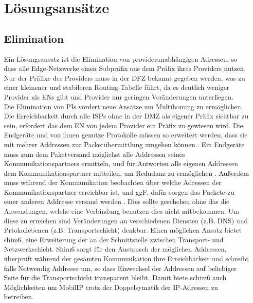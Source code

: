 \section{Lösungsansätze}
\subsection{Elimination}
Ein Lösungsansatz ist die Elimination von providerunabhängigen Adressen, so dass alle Edge-Netzwerke einen Subpräfix aus dem Präfix ihres Providers nutzen. Nur der Präfixe des Providers muss in der DFZ bekannt gegeben werden, was zu einer kleinener und stabileren Routing-Tabelle führt, da es deutlich weniger Provider als ENs gibt und Provider nur geringen Veränderungen unterliegen.\\

Die Elimination von PIs vordert neue Ansätze um Multihoming zu ermöglichen. Die Erreichbarkeit durch alle ISPs ohne in der DMZ als eigener Präfix sichtbar zu sein, erfordert das dem EN von jedem Provider ein Präfix zu gewiesen wird. Die Endgeräte und von ihnen genutze Protokolle müssen so erweitert werden, dass sie mit mehrer Addressen zur Packetübermittlung umgehen können \cite{jen:2008:start}. Ein Endgeräte muss zum dem Paketversand möglichst alle Addressen seines Kommunikationspartners ermitteln, und für Antworten alle eigenen Addressen dem Kommunikationspartner mitteilen, um Redudanz zu ermöglichen \cite{jen:2008:start}. Außerdem muss während der Kommunikation beobachten über welche Adressen der Kommunikationspartner erreichbar ist, und ggF. dafür sorgen das Packete zu einer anderen Addresse versand werden \cite{jen:2008:start}. Dies sollte geschehen ohne das die Anwendungen, welche eine Verbindung benutzen dies nicht mitbekommen. Um diese zu erreichen sind Veränderungen an verschiedenen Diensten (z.B. DNS) und Prtokollebenen (z.B. Transportschicht) denkbar. Einen möglichen Ansatz bietet shim6\cite{nordmark:2009:RFC5533}, eine Erweiterung der an der Schnittstelle zwischen Transport- und Netzwerkschicht. Shim6 sorgt für den Austausch der möglichen Addressen, überprüft während der gesamten Kommunikation ihre Erreichbarkeit und schreibt falls Notwendig Addresse um, so dass Einwechsel der Addressen auf beliebiger Seite für die Transportschicht transparent bleibt. Damit biete schim6 auch Möglichkeiten um MobilIP trotz der Doppelsymatik der IP-Adressen zu betreiben. \\

